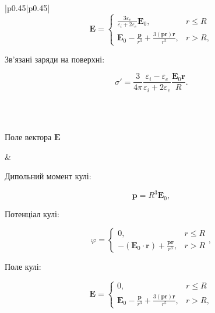 \documentclass[12pt, oneside]{extarticle}
\newcommand{\vect}[1]{\symbf{#1}}
\newcommand{\vect}[1]{\mathbf{#1}}
\def\Efield{\vect{E}}
\let\phi\varphi
\let\epsilon\varepsilon}
\begin{document}
\begin{center}
\begin{longtable}{|p{}|p{}|}
		\[
			\Efield =
			\begin{cases}
				\frac{3\epsilon_e}{\epsilon_i + 2\epsilon_e} \Efield_0,                                 & r \le R \\
				\Efield_0 - \frac{\vect{p}}{r^3} + \frac{3\left(\vect{p}\vect{r}\right)\vect{r} }{r^5}, & r > R,
			\end{cases}
		\]

		Зв'язані заряди на поверхні:

		\[\sigma' = \frac{3}{4\pi} \frac{\epsilon_i - \epsilon_e}{\epsilon_i + 2\epsilon_e} \frac{\Efield_0\vect{r}}{R}.\]


		\\
		\hline\pagebreak
		                                                                                                                                   \\
		\hline

		\begin{center}
			Поле вектора $\Efield$

			

		\end{center}

		                                                                                                                   &

		Дипольний момент кулі:

		\[\vect{p} = R^3\Efield_0,\]

		Потенціал кулі:

		\[
			\phi =
			\begin{cases}
				0,                                                                      & r \le R \\
				-\left( \Efield_0\cdot \vect{r}\right) + \frac{\vect{p} \vect{r}}{r^3}, & r > R
			\end{cases}
			,\]

		Поле кулі:

		\[
			\Efield =
			\begin{cases}
				0,                                                                                      & r \le R \\
				\Efield_0 - \frac{\vect{p}}{r^3} + \frac{3\left(\vect{p}\vect{r}\right)\vect{r} }{r^5}, & r > R,
			\end{cases}
		\]


\end{longtable}
\end{center}
\end{document}
